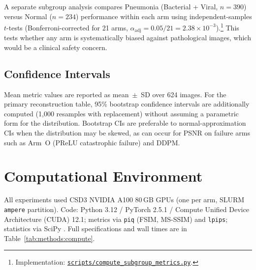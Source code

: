\documentclass[12pt, a4paper, twoside, openright]{book}
\begin{document}
A separate subgroup analysis compares Pneumonia (Bacterial + Viral, $n=390$) versus Normal ($n=234$) performance within each arm using independent-samples $t$-tests (Bonferroni-corrected for 21 arms, $\alpha_{\mathrm{adj}} = 0.05/21 = 2.38 \times 10^{-3}$).\footnote{Implementation: \href{https://github.com/teklesam/ppva_hformer_codebase/blob/main/scripts/compute_subgroup_metrics.py}{\texttt{scripts/compute\_subgroup\_metrics.py}}.} This tests whether any arm is systematically biased against pathological images, which would be a clinical safety concern.

\subsection{Confidence Intervals}

Mean metric values are reported as mean~$\pm$~SD over 624 images. For the primary reconstruction table, 95\% bootstrap confidence intervals are additionally computed (1{,}000 resamples with replacement) without assuming a parametric form for the distribution. Bootstrap CIs are preferable to normal-approximation CIs when the distribution may be skewed, as can occur for PSNR on failure arms such as Arm~O (PReLU catastrophic failure) and DDPM.

\section{Computational Environment}
\label{sec:methods:compute}

All experiments used CSD3 NVIDIA A100 80\,GB GPUs (one per arm, SLURM \texttt{ampere} partition). Code: Python 3.12 / PyTorch 2.5.1 / Compute Unified Device Architecture (CUDA) 12.1; metrics via \texttt{piq} (FSIM, MS-SSIM) and \texttt{lpips}; statistics via SciPy \cite{virtanen_scipy_2020}. Full specifications and wall times are in Table~\ref{tab:methods:compute}.
\end{document}
